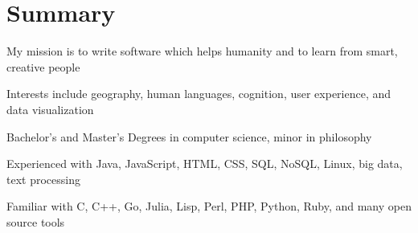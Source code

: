 \raggedright
\section*{Summary}
  \begin{compactitem}
  \item My mission is to write software which helps humanity and to learn from smart, creative people
  \item Interests include geography, human languages, cognition, user experience, and data visualization
  \item Bachelor's and Master's Degrees in computer science, minor in philosophy
  \item Experienced with Java, JavaScript, HTML, CSS, SQL, NoSQL, Linux, big data, text processing
  \item Familiar with C, C++, Go, Julia, Lisp, Perl, PHP, Python, Ruby, and many open source tools
  \end{compactitem}
